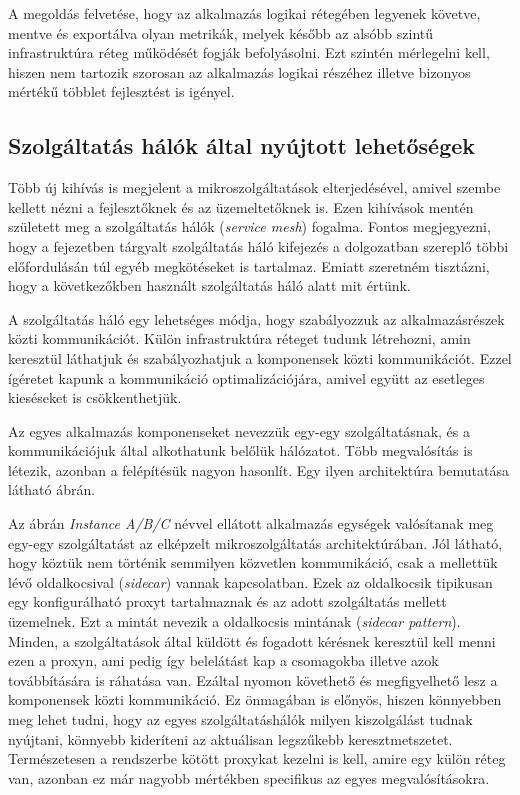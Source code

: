 A megoldás felvetése, hogy az alkalmazás logikai rétegében legyenek követve, mentve és exportálva olyan metrikák, melyek később az alsóbb szintű infrastruktúra réteg működését fogják befolyásolni.
Ezt szintén mérlegelni kell, hiszen nem tartozik szorosan az alkalmazás logikai részéhez illetve bizonyos mértékű többlet fejlesztést is igényel.

\subsection{Szolgáltatás hálók által nyújtott lehetőségek}
Több új kihívás is megjelent a mikroszolgáltatások elterjedésével, amivel szembe kellett nézni a fejlesztőknek és az üzemeltetőknek is.
Ezen kihívások mentén született meg a szolgáltatás hálók (\textit{service mesh}) fogalma. 
Fontos megjegyezni, hogy a fejezetben tárgyalt szolgáltatás háló kifejezés a dolgozatban szereplő többi előfordulásán túl egyéb megkötéseket is tartalmaz.
Emiatt szeretném tisztázni, hogy a következőkben használt szolgáltatás háló alatt mit értünk.

A szolgáltatás háló egy lehetséges módja, hogy szabályozzuk az alkalmazásrészek közti kommunikációt. 
Külön infrastruktúra réteget tudunk létrehozni, amin keresztül láthatjuk és szabályozhatjuk a komponensek közti kommunikációt.
Ezzel ígéretet kapunk a kommunikáció optimalizációjára, amivel együtt az esetleges kieséseket is csökkenthetjük\citep{serviceMeshDefinition}.

Az egyes alkalmazás komponenseket nevezzük egy-egy szolgáltatásnak, és a kommunikációjuk által alkothatunk belőlük hálózatot.
Több megvalósítás is létezik, azonban a felépítésük nagyon hasonlít.
Egy ilyen architektúra bemutatása látható  ábrán.

Az ábrán \textit{Instance A/B/C} névvel ellátott alkalmazás egységek valósítanak meg egy-egy szolgáltatást az elképzelt mikroszolgáltatás architektúrában. 
Jól látható, hogy köztük nem történik semmilyen közvetlen kommunikáció, csak a mellettük lévő oldalkocsival (\textit{sidecar}) vannak kapcsolatban.
Ezek az oldalkocsik tipikusan egy konfigurálható proxyt tartalmaznak és az adott szolgáltatás mellett üzemelnek.
Ezt a mintát nevezik a oldalkocsis mintának (\textit{sidecar pattern})\citep{sidecarPattern}.
Minden, a szolgáltatások által küldött és fogadott kérésnek keresztül kell menni ezen a proxyn, ami pedig így belelátást kap a csomagokba illetve azok továbbítására is ráhatása van.
Ezáltal nyomon követhető és megfigyelhető lesz a komponensek közti kommunikáció.
Ez önmagában is előnyös, hiszen könnyebben meg lehet tudni, hogy az egyes szolgáltatáshálók milyen kiszolgálást tudnak nyújtani, könnyebb kideríteni az aktuálisan legszűkebb keresztmetszetet.
Természetesen a rendszerbe kötött proxykat kezelni is kell, amire egy külön réteg van, azonban ez már nagyobb mértékben specifikus az egyes megvalósításokra.


